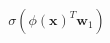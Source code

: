 \documentclass[preview]{standalone}
\begin{document}
\begin{align*}
\sigma(\phi(\mathbf{x})^T\mathbf{w}_1)
\end{align*}
\end{document}
